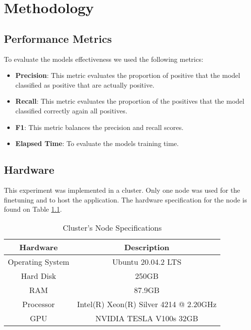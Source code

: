 
\chapter{Methodology}  

\section{Performance Metrics}
To evaluate the models effectiveness we used the following metrics:

\begin{itemize}
	\item{\textbf{Precision}}: This metric evaluates the proportion of positive that the model classified as positive that are actually positive.
	\item{\textbf{Recall}}: This metric evaluates the proportion of the positives that the model classified correctly again all positives.
	\item{\textbf{F1}}: This metric balances the precision and recall scores.
	\item{\textbf{Elapsed Time}}: To evaluate the models training time.
	
\end{itemize}


\section{Hardware}
This experiment was implemented in a cluster. Only one node was used for the finetuning and to host the application. The hardware specification
for the node is found on Table \ref{table:hardware}.

\begin{table}[ht!]
\centering
\caption{Cluster's Node Specifications}
\begin{tabular}{||c | c||} 
 \hline
\textbf{Hardware} & \textbf{Description} \\ [0.5ex] 
 \hline
 Operating System & Ubuntu 20.04.2 LTS \\ [0.5ex] 
 \hline
 Hard Disk & 250GB  \\ [0.5ex] 
 \hline
 RAM & 87.9GB  \\ [0.5ex] 
 \hline
 Processor & Intel(R) Xeon(R) Silver 4214 @ 2.20GHz \\ [0.5ex] 
 \hline
 GPU & NVIDIA TESLA V100s 32GB \\ [0.5ex] 
 \hline
\end{tabular}
\label{table:hardware}
\end{table}


